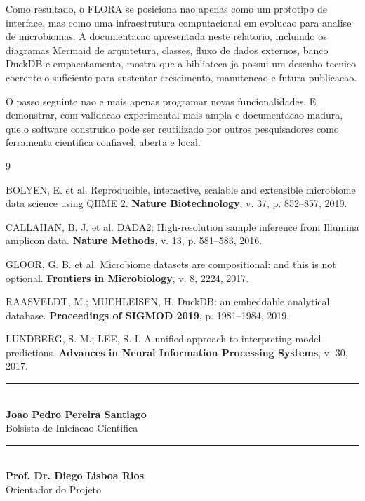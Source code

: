 \documentclass[12pt,a4paper]{article}
\begin{document}
Como resultado, o FLORA se posiciona nao apenas como um prototipo de interface, mas como uma infraestrutura computacional em evolucao para analise de microbiomas. A documentacao apresentada neste relatorio, incluindo os diagramas Mermaid de arquitetura, classes, fluxo de dados externos, banco DuckDB e empacotamento, mostra que a biblioteca ja possui um desenho tecnico coerente o suficiente para sustentar crescimento, manutencao e futura publicacao.

O passo seguinte nao e mais apenas programar novas funcionalidades. E demonstrar, com validacao experimental mais ampla e documentacao madura, que o software construido pode ser reutilizado por outros pesquisadores como ferramenta cientifica confiavel, aberta e local.

\newpage
\renewcommand{\refname}{Referencias Bibliograficas}
\begin{thebibliography}{9}

BOLYEN, E. et al. Reproducible, interactive, scalable and extensible microbiome data science using QIIME 2. \textbf{Nature Biotechnology}, v. 37, p. 852--857, 2019.

CALLAHAN, B. J. et al. DADA2: High-resolution sample inference from Illumina amplicon data. \textbf{Nature Methods}, v. 13, p. 581--583, 2016.

GLOOR, G. B. et al. Microbiome datasets are compositional: and this is not optional. \textbf{Frontiers in Microbiology}, v. 8, 2224, 2017.

RAASVELDT, M.; MUEHLEISEN, H. DuckDB: an embeddable analytical database. \textbf{Proceedings of SIGMOD 2019}, p. 1981--1984, 2019.

LUNDBERG, S. M.; LEE, S.-I. A unified approach to interpreting model predictions. \textbf{Advances in Neural Information Processing Systems}, v. 30, 2017.

\end{thebibliography}

\vspace{3cm}
\begin{center}
    \rule{8cm}{0.5pt}\\
    \textbf{Joao Pedro Pereira Santiago}\\
    Bolsista de Iniciacao Cientifica

    \vspace{2cm}

    \rule{8cm}{0.5pt}\\
    \textbf{Prof. Dr. Diego Lisboa Rios}\\
    Orientador do Projeto
\end{center}
\end{document}
